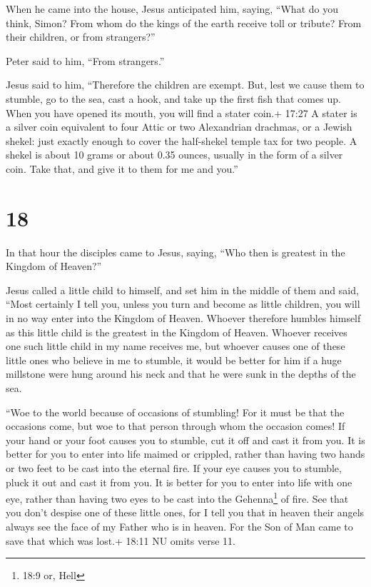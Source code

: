 When he came into the house, Jesus anticipated him, saying, ``What do
you think, Simon? From whom do the kings of the earth receive toll or
tribute? From their children, or from strangers?''

 Peter said to him, ``From strangers.''

Jesus said to him, ``Therefore the children are exempt. 
But, lest we cause them to stumble, go to the sea, cast a hook, and take
up the first fish that comes up. When you have opened its mouth, you
will find a stater coin.+ 17:27 A stater is a silver coin equivalent to
four Attic or two Alexandrian drachmas, or a Jewish shekel: just exactly
enough to cover the half-shekel temple tax for two people. A shekel is
about 10 grams or about 0.35 ounces, usually in the form of a silver
coin. Take that, and give it to them for me and you.''

\hypertarget{section-17}{%
\section{18}\label{section-17}}

 In that hour the disciples came to Jesus, saying, ``Who
then is greatest in the Kingdom of Heaven?''

 Jesus called a little child to himself, and set him in the
middle of them  and said, ``Most certainly I tell you,
unless you turn and become as little children, you will in no way enter
into the Kingdom of Heaven.  Whoever therefore humbles
himself as this little child is the greatest in the Kingdom of Heaven.
 Whoever receives one such little child in my name receives
me,  but whoever causes one of these little ones who believe
in me to stumble, it would be better for him if a huge millstone were
hung around his neck and that he were sunk in the depths of the sea.

 ``Woe to the world because of occasions of stumbling! For
it must be that the occasions come, but woe to that person through whom
the occasion comes!  If your hand or your foot causes you to
stumble, cut it off and cast it from you. It is better for you to enter
into life maimed or crippled, rather than having two hands or two feet
to be cast into the eternal fire.  If your eye causes you to
stumble, pluck it out and cast it from you. It is better for you to
enter into life with one eye, rather than having two eyes to be cast
into the Gehenna\footnote{18:9 or, Hell} of fire.  See that
you don't despise one of these little ones, for I tell you that in
heaven their angels always see the face of my Father who is in heaven.
 For the Son of Man came to save that which was lost.+
18:11 NU omits verse 11.

